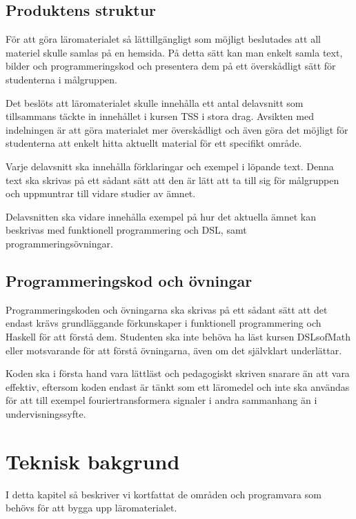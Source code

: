 \documentclass[]{article}
\begin{document}
\subsection{Produktens struktur}
För att göra läromaterialet så lättillgängligt som möjligt beslutades att
all materiel skulle samlas på en hemsida. På detta sätt kan man enkelt
samla text, bilder och programmeringskod och presentera dem på ett
överskådligt sätt för studenterna i målgruppen.

Det beslöts att läromaterialet skulle innehålla ett antal delavsnitt som
tillsammans täckte in innehållet i kursen TSS i stora drag.
Avsikten med indelningen är att göra materialet mer överskådligt och
även göra det möjligt för studenterna att enkelt hitta aktuellt material
för ett specifikt område.

Varje delavsnitt ska innehålla förklaringar och exempel i löpande text.
Denna text ska skrivas på ett sådant sätt att den är lätt att ta till
sig för målgruppen och uppmuntrar till vidare studier av ämnet.

Delavsnitten ska vidare innehålla exempel på hur det aktuella ämnet kan
beskrivas med funktionell programmering och DSL, samt programmeringsövningar.

\subsection{Programmeringskod och övningar}

Programmeringskoden och övningarna ska skrivas på ett sådant sätt att det endast krävs grundläggande förkunskaper i
funktionell programmering och Haskell för att förstå dem. Studenten ska inte behöva ha läst kursen DSLsofMath eller
motsvarande för att förstå övningarna, även om det självklart underlättar.

Koden ska i första hand vara lättläst och pedagogiskt skriven snarare än att vara effektiv, eftersom koden endast är
tänkt som ett läromedel och inte ska användas för att till exempel fouriertransformera signaler i andra sammanhang än i
undervisningssyfte.


\section{Teknisk bakgrund}
I detta kapitel så beskriver vi kortfattat de områden och programvara som
behövs för att bygga upp läromaterialet.
\end{document}
